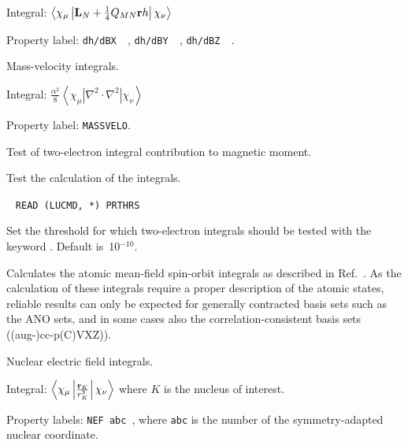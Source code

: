 \begin{description}
\begin{list}{}{}
\item Integral:
$\left<\chi_{\mu}\left|{\bf L}_N + \frac{1}{4}Q_{MN}{\bf
r}h\right|\chi_{\nu}\right>$
\item Property label: \verb|dh/dBX  |, \verb|dh/dBY  |, \verb|dh/dBZ  |.
\end{list}

\item[\Key{MASSVE}] Mass-velocity integrals.

\begin{list}{}{}
\item Integral:
$\frac{\alpha^2}{8}\left<\chi_{\mu}\left|\nabla^{2}\cdot\nabla^2\right|\chi_{\nu}\right>$
\item Property label: \verb|MASSVELO|.
\end{list}

\item[\Key{MGMO2T}] Test of two-electron integral contribution to
magnetic moment.

\item[\Key{MGMOMT}] Test the calculation of the 
integrals.

\item[\Key{MGMTHR}]\verb| |\newline
\verb|READ (LUCMD, *) PRTHRS|

Set the threshold for which two-electron integrals should be tested
 with the keyword . Default is~10$^{-10}$.

\item[\Key{MNF-SO}] Calculates the atomic mean-field spin-orbit
 integrals as described in Ref.~\cite{bahcmmuwogcpl251}. As the
 calculation of these 
 integrals require a proper description of the atomic states, reliable
 results can only be expected for generally contracted basis sets such
 as the ANO sets, and in some cases also the correlation-consistent
 basis sets ((aug-)cc-p(C)VXZ)).

\item[\Key{NELFLD}] Nuclear electric field integrals.

\begin{list}{}{}
\item Integral:
$\left<\chi_{\mu}\left|\frac{{\bf r}_K}{r_{K}^3}\right|\chi_{\nu}\right>$
where $K$ is the nucleus of interest.
\item Property labels: \verb|NEF abc |, where \verb|abc| is the number
of the symmetry-adapted nuclear coordinate.
\end{list}


\end{description}
